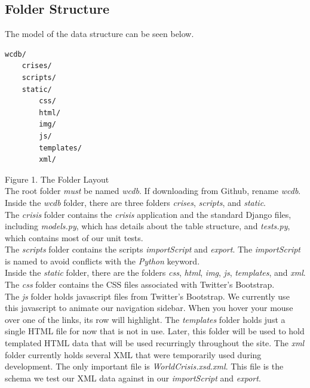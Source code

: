 \documentclass[12pt]{report}
\begin{document}
\subsection*{Folder Structure}
\hfill


The model of the data structure can be seen below.\\

\begin{lstlisting}
wcdb/
    crises/
    scripts/
    static/
        css/
        html/
        img/
        js/
        templates/
        xml/
\end{lstlisting}
\footnotesize Figure 1. The Folder Layout \normalsize
\hfill\\


The root folder \emph{must} be named \emph{wcdb}.
If downloading from Github, rename \emph{wcdb}.
Inside the \emph{wcdb} folder, there are three folders \emph{crises}, \emph{scripts}, and \emph{static}.\\


The \emph{crisis} folder contains the \emph{crisis} application and the standard Django files,
including \emph{models.py}, which has details about the table structure, and \emph{tests.py}, which contains
most of our unit tests.\\


The \emph{scripts} folder contains the scripts \emph{importScript} and \emph{export}.
The \emph{importScript} is named to avoid conflicts with the \emph{Python} keyword.\\


Inside the \emph{static} folder, there are the folders \emph{css}, \emph{html}, \emph{img}, \emph{js}, \emph{templates}, and \emph{xml}.
The \emph{css} folder contains the CSS files associated with Twitter's Bootstrap.\\


The \emph{js} folder holds javascript files from Twitter's Bootstrap.
We currently use this javascript to animate our navigation sidebar.
When you hover your mouse over one of the links, its row will highlight.
The \emph{templates} folder holds just a single HTML file for now that is not in use.
Later, this folder will be used to hold templated HTML data that will be used recurringly throughout the site.
The \emph{xml} folder currently holds several XML that were temporarily used during development.
The only important file is \emph{WorldCrisis.xsd.xml}.
This file is the schema we test our XML data against in our \emph{importScript} and \emph{export}.\\
\end{document}
